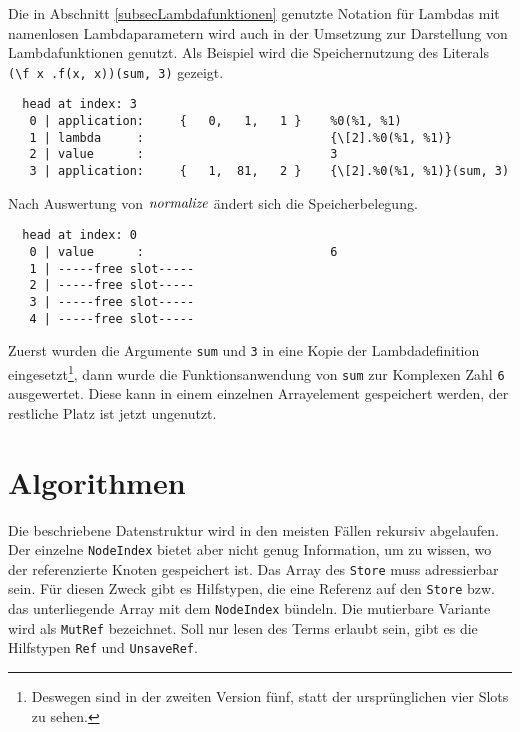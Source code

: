 \begin{beispiel} \label{bspREPLlambda}
Die in Abschnitt \ref{subsecLambdafunktionen} genutzte Notation für Lambdas mit namenlosen Lambdaparametern wird auch in der Umsetzung zur Darstellung von Lambdafunktionen genutzt. Als Beispiel wird die Speichernutzung des Literals \verb|(\f x .f(x, x))(sum, 3)| gezeigt.
\begin{unbreakable}\begin{verbatim}
  head at index: 3
   0 | application:     {   0,   1,   1 }    %0(%1, %1)
   1 | lambda     :                          {\[2].%0(%1, %1)}
   2 | value      :                          3
   3 | application:     {   1,  81,   2 }    {\[2].%0(%1, %1)}(sum, 3)
\end{verbatim}\end{unbreakable}
Nach Auswertung von $\mathit{normalize}$ ändert sich die Speicherbelegung.
\begin{unbreakable}\begin{verbatim}
  head at index: 0
   0 | value      :                          6
   1 | -----free slot-----
   2 | -----free slot-----
   3 | -----free slot-----
   4 | -----free slot-----
\end{verbatim}\end{unbreakable}
Zuerst wurden die Argumente \verb|sum| und \verb|3| in eine Kopie der Lambdadefinition eingesetzt\footnote{Deswegen sind in der zweiten Version fünf, statt der ursprünglichen vier Slots zu sehen.}, dann wurde die Funktionsanwendung von \verb|sum| zur Komplexen Zahl \verb|6| ausgewertet. Diese kann in einem einzelnen Arrayelement gespeichert werden, der restliche Platz ist jetzt ungenutzt.
\end{beispiel}





\section{Algorithmen} \label{subsecCppAlgos}

Die beschriebene Datenstruktur wird in den meisten Fällen rekursiv abgelaufen. Der einzelne \verb|NodeIndex| bietet aber nicht genug Information, um zu wissen, wo der referenzierte Knoten gespeichert ist. Das Array des \verb|Store| muss adressierbar sein. Für diesen Zweck gibt es Hilfstypen, die eine Referenz auf den \verb|Store| bzw. das unterliegende Array mit dem \verb|NodeIndex| bündeln. Die mutierbare Variante wird als \verb|MutRef| bezeichnet. Soll nur lesen des Terms erlaubt sein, gibt es die Hilfstypen \verb|Ref| und \verb|UnsaveRef|. 

